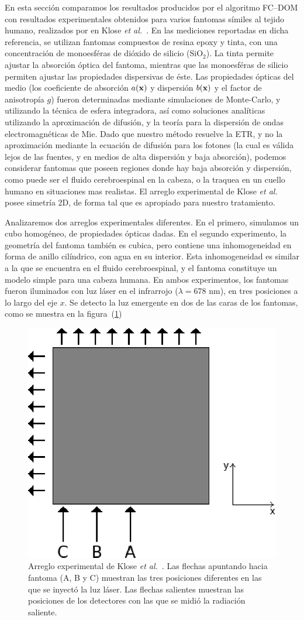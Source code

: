 En esta sección comparamos los resultados producidos por el algoritmo FC--DOM 
con resultados experimentales obtenidos para varios 
fantomas símiles al tejido humano, realizados por en Klose \textit{et al.}~\cite{Klose2002}. 
En las mediciones reportadas en dicha referencia, 
se utilizan fantomas compuestos de resina epoxy y tinta, 
con una concentración de monoesféras de dióxido de silicio ($\text{SiO}_2$). 
La tinta permite ajustar la absorción óptica del fantoma, 
mientras que las monoesféras de silicio permiten ajustar las propiedades 
dispersivas de éste. Las propiedades ópticas del medio (los coeficiente de absorción $a(\mathbf{x})$
y dispersión $b(\mathbf{x})$ y el 
factor de anisotropía $g$) fueron determinadas mediante simulaciones de Monte-Carlo, 
y utilizando la técnica de esfera integradora, así como soluciones analíticas 
utilizando la aproximación de difusión, y la teoría para 
la dispersión de ondas electromagnéticas de Mie. 
Dado que nuestro método resuelve la ETR, y no la aproximación mediante 
la ecuación de difusión para los fotones 
(la cual es válida lejos de las fuentes, y en medios de alta dispersión y 
baja absorción), podemos considerar fantomas que poseen 
regiones donde hay baja absorción y dispersión, como puede ser el fluido cerebroespinal 
en la cabeza, o la traquea en un cuello humano en situaciones mas realistas. 
El arreglo experimental de Klose \textit{et al.} posee 
simetría 2D, de forma tal que es apropiado para nuestro tratamiento. 

Analizaremos dos arreglos experimentales diferentes.
 En el primero, simulamos un cubo homogéneo, de propiedades ópticas dadas.
 En el segundo experimento, la geometría del fantoma también 
 es cubica, pero contiene una inhomogeneidad en forma 
 de anillo cilíndrico, con agua en su interior. Esta inhomogeneidad 
 es similar a la que se encuentra en 
 el fluido cerebroespinal, y el fantoma constituye un modelo 
 simple para una cabeza humana. En ambos experimentos,
los fantomas fueron iluminados con luz láser en el 
infrarrojo ($\lambda = 678$ nm), en tres posiciones a lo largo del eje $x$. Se detecto la luz emergente 
en dos de las caras de los fantomas, como se muestra en la figura~(\ref{fig:phantom})

\begin{figure}[h!]
\centering
  \includegraphics[width=0.4\linewidth]{figuras/phantom.eps}
   \caption{Arreglo experimental de Klose \textit{et al.}~\cite{Klose2002}. 
   Las flechas apuntando hacia fantoma (A, B y C)  
   muestran las tres posiciones diferentes en las que se inyectó 
   la luz láser. Las flechas salientes muestran las posiciones de los detectores 
   con las que se midió la radiación saliente.}
 \label{fig:phantom}
\end{figure}

